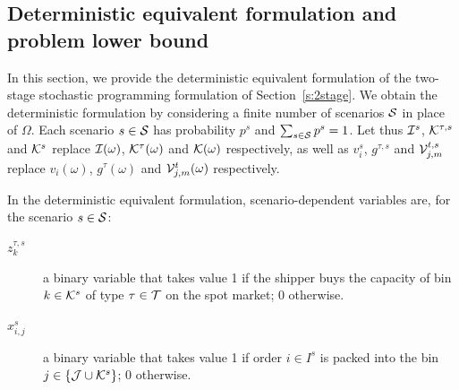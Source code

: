 \documentclass[a4paper,11pt]{article}
\begin{document}
	\subsection{Deterministic equivalent formulation and problem lower bound}\label{s:deteq}
	In this section, we provide the deterministic equivalent formulation of the two-stage stochastic programming formulation of Section~\ref{s:2stage}.
	We obtain the deterministic formulation by considering a finite number of scenarios ${\cal S}$ in place of $ \Omega$.
	Each scenario $s \in {\cal S}$ has probability $p^{s}$ and $\sum_{s \in {\cal S}} p^{s} = 1$. 
	Let thus ${\cal I}^{s}$, ${\cal K}^{\tau,s}$ and ${\cal K}^{s}$ replace ${\cal I}(\omega)$, ${\cal K}^{\tau}(\omega)$ and ${\cal K}(\omega)$ respectively, as well as $v_i^{s}$, $g^{\tau,s}$ and ${\cal V}_{j,m}^{t,s}$ replace $v_i(\omega)$, $g^\tau(\omega)$ and ${\cal V}_{j,m}^t(\omega)$ respectively.
	
	In the deterministic equivalent formulation, scenario-dependent variables are, for the scenario $ s \in {\cal S}$: 
	\begin{description}
		\item[$z_k^{\tau,s}$] a binary variable that takes value 1 if the shipper buys the capacity of bin $ k \in {\cal K}^s$ of type $ \tau \in {\cal T}$ on the spot market; 0 otherwise.
		\item[$ x_{i,j}^{s}$] a binary variable that takes value 1 if order $ i \in I^s$ is packed into the bin $ j \in \{{\cal J} \cup {\cal K}^s\}$; 0 otherwise.
	\end{description}	
	
\end{document}
